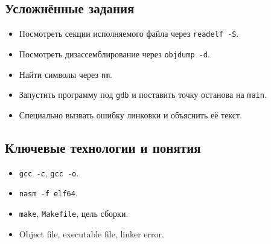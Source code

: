 \subsection*{Усложнённые задания}
\begin{itemize}
    \item Посмотреть секции исполняемого файла через \texttt{readelf -S}.
    \item Посмотреть дизассемблирование через \texttt{objdump -d}.
    \item Найти символы через \texttt{nm}.
    \item Запустить программу под \texttt{gdb} и поставить точку останова на \texttt{main}.
    \item Специально вызвать ошибку линковки и объяснить её текст.
\end{itemize}

\subsection*{Ключевые технологии и понятия}
\begin{itemize}
    \item \texttt{gcc -c}, \texttt{gcc -o}.
    \item \texttt{nasm -f elf64}.
    \item \texttt{make}, \texttt{Makefile}, цель сборки.
    \item Object file, executable file, linker error.
\end{itemize}
